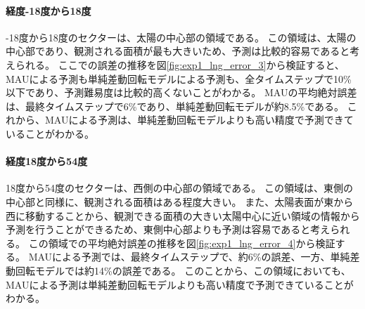           \paragraph{経度-18度から18度}
          -18度から18度のセクターは、太陽の中心部の領域である。
          この領域は、太陽の中心部であり、観測される面積が最も大きいため、予測は比較的容易であると考えられる。
          ここでの誤差の推移を図\ref{fig:exp1_lng_error_3}から検証すると、MAUによる予測も単純差動回転モデルによる予測も、全タイムステップで10\%以下であり、予測難易度は比較的高くないことがわかる。
          MAUの平均絶対誤差は、最終タイムステップで6\%であり、単純差動回転モデルが約8.5\%である。
          これから、MAUによる予測は、単純差動回転モデルよりも高い精度で予測できていることがわかる。
          
          \paragraph{経度18度から54度}
          18度から54度のセクターは、西側の中心部の領域である。
          この領域は、東側の中心部と同様に、観測される面積はある程度大きい。
          また、太陽表面が東から西に移動することから、観測できる面積の大きい太陽中心に近い領域の情報から予測を行うことができるため、東側中心部よりも予測は容易であると考えられる。
          この領域での平均絶対誤差の推移を図\ref{fig:exp1_lng_error_4}から検証する。
          MAUによる予測では、最終タイムステップで、約6\%の誤差、一方、単純差動回転モデルでは約14\%の誤差である。
          このことから、この領域においても、MAUによる予測は単純差動回転モデルよりも高い精度で予測できていることがわかる。


